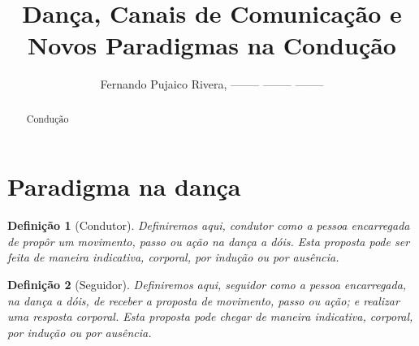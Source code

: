 \documentclass[a4paper,10pt]{article}
\title{Dança, Canais de Comunicação e Novos Paradigmas na Condução}
\author{Fernando Pujaico Rivera, -------- -------- --------}
\date{}
\newtheorem{mydef}{Definição}
\begin{document}
\maketitle

\begin{abstract}
Condução
\end{abstract}


\section{Paradigma na dança}


\begin{mydef}[Condutor]
Definiremos aqui, condutor como a pessoa encarregada de propôr um movimento, passo ou ação na dança a dóis.
Esta proposta pode ser feita de maneira indicativa, corporal, por indução ou por ausência.
\end{mydef}

\begin{mydef}[Seguidor]
Definiremos aqui, seguidor como a pessoa encarregada, na dança a dóis, 
de  receber a proposta de movimento, passo ou ação;
e realizar uma resposta corporal.
Esta proposta pode chegar de maneira indicativa, corporal, por indução ou por ausência.
\end{mydef}
\end{document}
